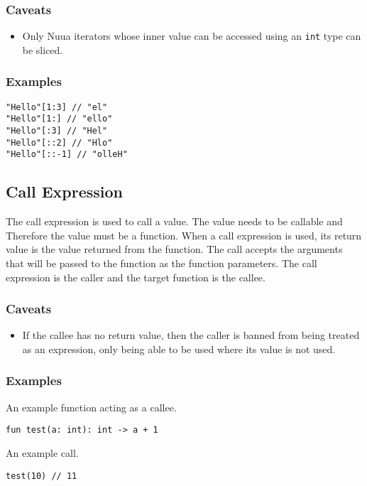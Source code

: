 \subsubsection{Caveats}

\begin{itemize}
    \item Only Nuua iterators whose inner value can be accessed using an \texttt{int} type can be sliced.
\end{itemize}

\subsubsection{Examples}

\begin{lstlisting}
"Hello"[1:3] // "el"
"Hello"[1:] // "ello"
"Hello"[:3] // "Hel"
"Hello"[::2] // "Hlo"
"Hello"[::-1] // "olleH"
\end{lstlisting}

\subsection{Call Expression}

The call expression is used to call a value. The value needs to be callable and Therefore the value must be a function.
When a call expression is used, its return value is the value returned from the function. The call accepts the arguments
that will be passed to the function as the function parameters.
The call expression is the caller and the target function is the callee.

\subsubsection{Caveats}

\begin{itemize}
    \item If the callee has no return value, then the caller is banned from being treated as an expression, only being
        able to be used where its value is not used.
\end{itemize}

\subsubsection{Examples}

An example function acting as a callee.
\begin{lstlisting}
fun test(a: int): int -> a + 1
\end{lstlisting}
An example call.
\begin{lstlisting}
test(10) // 11
\end{lstlisting}

